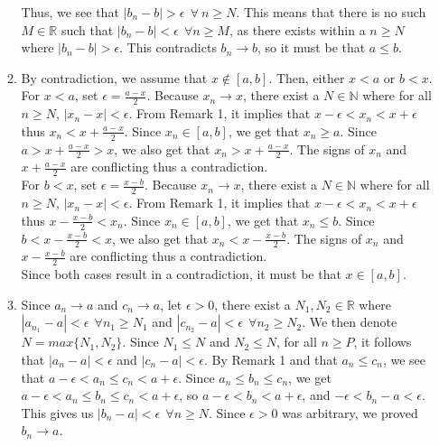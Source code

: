 \documentclass{article}
\begin{document}
\begin{enumerate}
\begin{enumerate}[label=\alph*)]
      Thus, we see that $|b_n -b| > \epsilon \ \ \forall \ n \geq N$. This means that there is no such $M\in \mathbb{R}$ such that $|b_n - b| < \epsilon \ \ \forall n \geq M$, as there exists within a $n \geq N$ where $|b_n -b| > \epsilon$. This contradicts $b_n \rightarrow b$, so it must be that $a \leq b$.\\
      
      \item 
      By contradiction, we assume that $x \notin [a, b]$. Then, either $x < a$ or $b < x$. \\

      For $x < a$, set $\epsilon = \frac{a-x}{2}$. Because $x_n \rightarrow x$, there exist a $N \in \mathbb{N}$ where for all $n \geq N$, $|x_n - x| < \epsilon$. From Remark 1, it implies that $x - \epsilon < x_n < x + \epsilon$ thus $x_n <  x + \frac{a - x }{2}$. Since $x_n \in [a,b]$, we get that $x_n \geq a$. Since $a > x + \frac{a-x}{2} > x$, we also get that $x_n > x + \frac{a - x }{2}$. The signs of $x_n$ and $x + \frac{a - x }{2}$ are conflicting thus a contradiction. \\

      For $ b< x$, set $\epsilon = \frac{x-b}{2}$. Because $x_n \rightarrow x$, there exist a $N \in \mathbb{N}$ where for all $n \geq N$, $|x_n - x| < \epsilon$. From Remark 1, it implies that $x - \epsilon < x_n < x + \epsilon$ thus $ x - \frac{x-b}{2} < x_n$. Since $x_n \in [a,b]$, we get that $x_n \leq b$. Since $b < x - \frac{x-b}{2} < x$, we also get that $x_n < x - \frac{x - b }{2}$. The signs of $x_n$ and $x - \frac{x - b}{2}$ are conflicting thus a contradiction. \\

      Since both cases result in a contradiction, it must be that $x \in [a, b]$.\\

      \item 
      Since $a_n \rightarrow a$ and $c_n \rightarrow a$, let $\epsilon > 0$, there exist a $N_1, N_2 \in \mathbb{R}$ where $|a_{n_1} - a| < \epsilon \ \ \forall n_1 \geq N_1$ and  $|c_{n_2} - a| < \epsilon \ \ \forall n_2 \geq N_2$. We then denote $N = max\{N_1, N_2\}$. Since $N_1 \leq N$ and $N_2 \leq N$, for all $n \geq P$, it follows that $|a_n - a| < \epsilon$ and  $|c_n - a| < \epsilon$. By Remark 1 and that $a_n \leq c_n$, we see that $a - \epsilon < a_n \leq c_n < a + \epsilon$. Since $a_n \leq b_n \leq c_n$, we get $a - \epsilon < a_n \leq b_n \leq c_n < a + \epsilon$, so $a - \epsilon < b_n < a + \epsilon$, and $ - \epsilon < b_n - a< \epsilon$. This gives us $|b_n - a| < \epsilon \ \ \forall n \geq N$. Since $\epsilon > 0$ was arbitrary, we proved $b_n \rightarrow a$.


\end{enumerate}
\end{enumerate}
\end{document}
